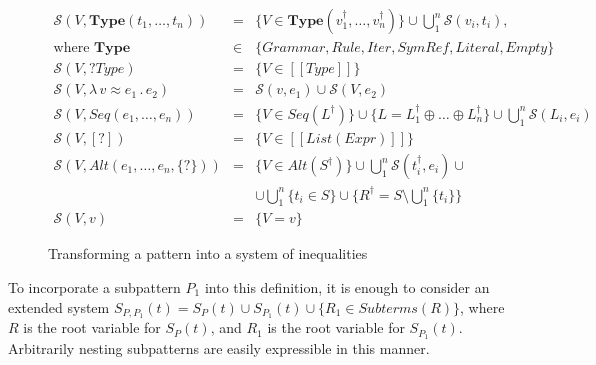\documentclass{IOS-Book-Article}     %
\newcommand{\abstr}[3]{\lambda \, #1 \approx #2 \,.\, #3}
\newcommand{\sem}[1]{[\![#1]\!]}
\newcommand{\fresh}[1]{#1^\dagger}
\newcommand{\Eq}{\mathcal{S}}
\begin{document}
\begin{figure}%
\centering%
$
\begin{array}{rcl}
\Eq(V, \mathbf{Type}(t_1, \ldots, t_n)) &=& \{V \in \mathbf{Type}(\fresh{v_1}, \ldots, \fresh{v_n})\} \cup 
\bigcup_1^n \Eq{}(v_i, t_i),\\
\mbox{where } \mathbf{Type} &\in& \{
	Grammar, Rule, Iter, SymRef, Literal, Empty\}\\

\Eq{}(V, ?Type) &=& \{V \in \sem{Type}\}\\

\Eq{}(V, \abstr{v}{e_1}{e_2}) &=& \Eq{}(v, e_1) \cup \Eq{}(V, e_2)\\

\Eq{}(V, Seq(e_1, \ldots, e_n)) &=& \{V \in Seq(\fresh{L})\} \cup \{ L = \fresh{L_1} \oplus \ldots \oplus \fresh{L_n}\} \cup \bigcup_1^n \Eq{}(L_i, e_i)\\

\Eq{}(V, [?]) &=& \{ V \in \sem{List(Expr)} \}\\

\Eq{}(V, Alt(e_1, \ldots, e_n, \{?\})) &=& \{V \in Alt(\fresh{S})\}
                                   \cup \bigcup_1^n \Eq{}(\fresh{t_i}, e_i) \cup \\
                               &&    
                                   \cup \bigcup_1^n \{ t_i \in S\}
                                   \cup \{ \fresh{R} = S \setminus
                                                          \bigcup_1^n\{t_i\}\}\\
\Eq{}(V, v) &=& \{V = v\}
\end{array}
$
\caption{Transforming a pattern into a system of inequalities}\label{Eq}%
\end{figure}%

To incorporate a subpattern $P_1$ into this definition, it is enough to consider an extended system $S_{P, P_1}(t) = S_P(t) \cup S_{P_1}(t) \cup \{R_1 \in Subterms(R)\}$, where $R$ is the root variable for $S_P(t)$, and $R_1$ is the root variable for $S_{P_1}(t)$. Arbitrarily nesting subpatterns are easily expressible in this manner.
\end{document}

